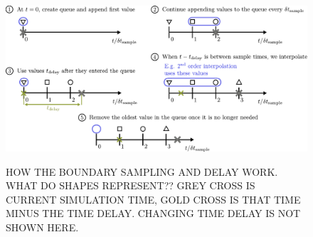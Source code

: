 \begin{figure}[t]
\centering
\includegraphics[scale=0.65]{assets/imgs/delay_bc_queue.pdf}
\label{fig:delay-queue}
\caption{HOW THE BOUNDARY SAMPLING AND DELAY WORK. WHAT DO SHAPES REPRESENT?? GREY CROSS IS CURRENT SIMULATION TIME, GOLD CROSS IS THAT TIME MINUS THE TIME DELAY. CHANGING TIME DELAY IS NOT SHOWN HERE.}
\end{figure}





